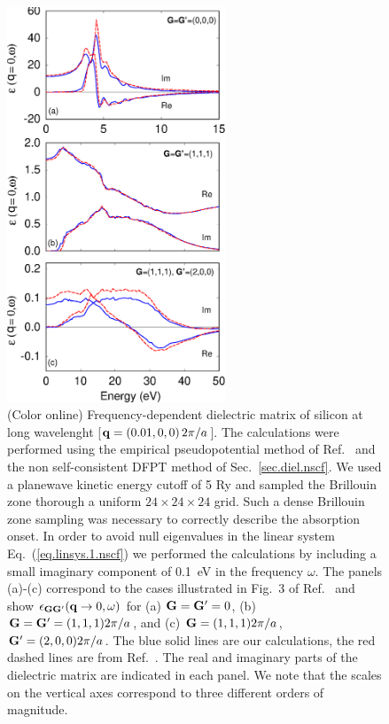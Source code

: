 \documentclass[twocolumn,prb,showpacs,superscriptaddress]{revtex4}
\def\w{\omega}
\def\q{{\bf q}}
\def\G{{\bf G}}
\def\Gp{{\bf G^\prime}}
\begin{document}
\begin  {figure}
\begin  {center}
\includegraphics[width=6.5cm]{fig2.eps}
\end    {center}
\caption{\label{fig2}
        (Color online)
        Frequency-dependent dielectric matrix of silicon at long wavelenght [$\q=(0.01,0,0) \, 2\pi/a$].
        The calculations were performed using the empirical pseudopotential method of Ref.\  
        and the non self-consistent DFPT method of Sec.\ \ref{sec.diel.nscf}.
        We used a planewave kinetic energy cutoff of 5 Ry and sampled the Brillouin zone thorough a uniform 
        $24\times 24\times 24$ grid. Such a dense Brillouin zone sampling was necessary to correctly describe
        the absorption onset. In order to avoid null eigenvalues in the linear system Eq.\ (\ref{eq.linsys.1.nscf})
        we performed the calculations by including a small imaginary component of 0.1~eV in the frequency $\w$.
        The panels (a)-(c) correspond to the cases illustrated in Fig.\ 3 of Ref.\ 
        and show $\epsilon_{\G\Gp}(\q\rightarrow 0,\w)$ for (a) $\G=\Gp=0$, (b) $\G=\Gp=(1,1,1) 2\pi/a$,
        and (c) $\G=(1,1,1) 2\pi/a$, $\Gp=(2,0,0) 2\pi/a$.
        The blue solid lines are our calculations, the red dashed lines are from Ref.\ .
        The real and imaginary parts of the dielectric matrix are indicated in each panel.
        We note that the scales on the vertical axes correspond to three different orders of magnitude.
        }
\end    {figure}
\end{document}
